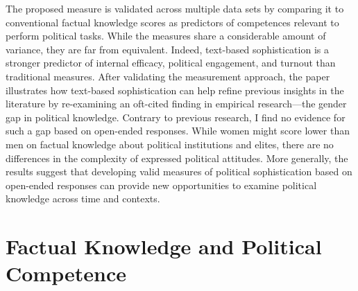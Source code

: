 \documentclass[12pt]{article}
\begin{document}
The proposed measure is validated across multiple data sets by comparing it to conventional factual knowledge scores as predictors of competences relevant to perform political tasks. While the measures share a considerable amount of variance, they are far from equivalent. Indeed, text-based sophistication is a stronger predictor of internal efficacy, political engagement, and turnout than traditional measures. After validating the measurement approach, the paper illustrates how text-based sophistication can help refine previous insights in the literature by re-examining an oft-cited finding in empirical research---the gender gap in political knowledge. Contrary to previous research, I find no evidence for such a gap based on open-ended responses. While women might score lower than men on factual knowledge about political institutions and elites, there are no differences in the complexity of expressed political attitudes. More generally, the results suggest that developing valid measures of political sophistication based on open-ended responses can provide new opportunities to examine political knowledge across time and contexts. 


\section*{Factual Knowledge and Political Competence}

\end{document}
